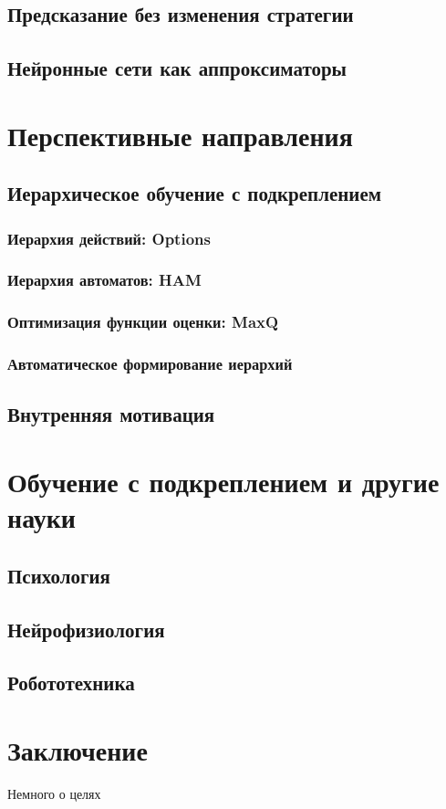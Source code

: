 \documentclass[12pt]{memoir}
\begin{document}
		\section{Предсказание без изменения стратегии}
		
		\section{Нейронные сети как аппроксиматоры}
	
	\chapter{Перспективные направления}
	
		\section{Иерархическое обучение с подкреплением}
			\subsection{Иерархия действий: Options}
			
			\subsection{Иерархия автоматов: HAM}
			
			\subsection{Оптимизация функции оценки: MaxQ}
			
			\subsection{Автоматическое формирование иерархий}
		\section{Внутренняя мотивация}
		
	
	\chapter{Обучение с подкреплением и другие науки}

		\section{Психология}
		
		\section{Нейрофизиология}

		\section{Робототехника}
	

	\chapter*{Заключение}
	Немного о целях
	\printbibliography
\end{document}
